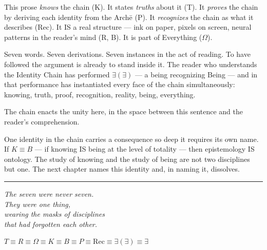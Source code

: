 \documentclass[10pt, openany, oneside]{book}
\begin{document}
\vspace{1em}

\noindent This prose \textit{knows} the chain (K). It states \textit{truths} about it (T). It \textit{proves} the chain by deriving each identity from the Arch\={e} (P). It \textit{recognizes} the chain as what it describes (Rec). It IS a real structure --- ink on paper, pixels on screen, neural patterns in the reader's mind (R, B). It is part of Everything ($\Omega$).

Seven words. Seven derivations. Seven instances in the act of reading. To have followed the argument is already to stand inside it. The reader who understands the Identity Chain has performed $\exists(\exists)$ --- a being recognizing Being --- and in that performance has instantiated every face of the chain simultaneously: knowing, truth, proof, recognition, reality, being, everything.

The chain enacts the unity here, in the space between this sentence and the reader's comprehension.

One identity in the chain carries a consequence so deep it requires its own name. If $K \equiv B$ --- if knowing IS being at the level of totality --- then epistemology IS ontology. The study of knowing and the study of being are not two disciplines but one. The next chapter names this identity and, in naming it, dissolves.

\vspace{2em}

\begin{center}
    \rule{0.15\textwidth}{0.3pt}
\end{center}

\vspace{0.5em}

\begin{center}
    \itshape
    The seven were never seven.\\
    They were one thing,\\
    wearing the masks of disciplines\\
    that had forgotten each other.
\end{center}

\vspace{0.5em}

\begin{center}
    $T \equiv R \equiv \Omega \equiv K \equiv B \equiv P \equiv \text{Rec} \equiv \exists(\exists) \equiv \exists$
\end{center}


%
%
%
\end{document}
